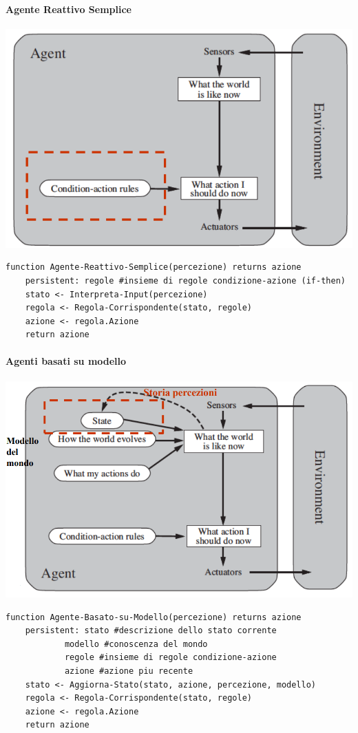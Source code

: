 \documentclass[10pt]{book}
\begin{document}
\paragraph{Agente Reattivo Semplice}
\begin{center}
	\includegraphics[scale=0.5]{agreattsemplice.png}
\end{center}
\begin{lstlisting}
function Agente-Reattivo-Semplice(percezione) returns azione
	persistent: regole #insieme di regole condizione-azione (if-then)
	stato <- Interpreta-Input(percezione)
	regola <- Regola-Corrispondente(stato, regole)
	azione <- regola.Azione
	return azione
\end{lstlisting}
\paragraph{Agenti basati su modello}
\begin{center}
	\includegraphics[scale=0.5]{agmodello.png}
\end{center}
\begin{lstlisting}
function Agente-Basato-su-Modello(percezione) returns azione
	persistent:	stato #descrizione dello stato corrente
			modello #conoscenza del mondo
			regole #insieme di regole condizione-azione
			azione #azione piu recente
	stato <- Aggiorna-Stato(stato, azione, percezione, modello)
	regola <- Regola-Corrispondente(stato, regole)
	azione <- regola.Azione
	return azione
\end{lstlisting}
\end{document}
